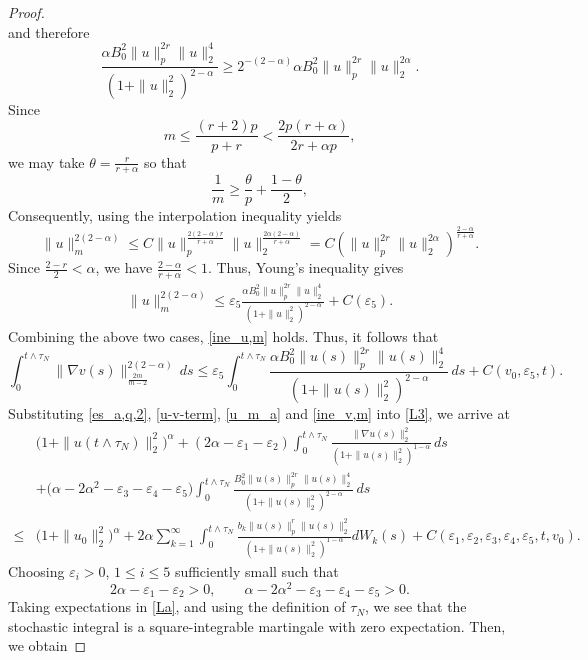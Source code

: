\documentclass[10pt,a4paper]{amsart}
\begin{document}
\begin{proof}
\[	\]
	and therefore
	\[
	\frac{\alpha{B_0^2}\|u\|_p^{2r}\|u\|_2^4}{(1+\|u\|_2^2)^{2-\alpha}}
	\ge
	2^{-(2-\alpha)}\alpha{B_0^2}\|u\|_p^{2r}\|u\|_2^{2\alpha}.
	\]
	Since
	\[
	m\le \frac{(r+2)p}{p+r}<\frac{2p(r+\alpha)}{2r+\alpha p},
	\]
	we may take $\theta=\frac{r}{r+\alpha}$ so that
	\[
	\frac1m\ge \frac{\theta}{p}+\frac{1-\theta}{2},
	\]
	Consequently, using the interpolation inequality yields
	\[
	\|u\|_m^{2(2-\alpha)}
	\le
	C\|u\|_p^{\frac{2(2-\alpha)r}{r+\alpha}}
	\|u\|_2^{\frac{2\alpha(2-\alpha)}{r+\alpha}}
	=
	C(\|u\|_p^{2r}\|u\|_2^{2\alpha})^{\frac{2-\alpha}{r+\alpha}}.
	\]
	Since $\frac{2-r}{2}<\alpha$, we have $\frac{2-\alpha}{r+\alpha}<1.$
	Thus, Young's inequality  gives
	\begin{align}
	    \|u\|_m^{2(2-\alpha)}
	\le
	\varepsilon_5\frac{\alpha{B_0^2}\|u\|_p^{2r}\|u\|_2^4}{(1+\|u\|_2^2)^{2-\alpha}}
	+
	C(\varepsilon_5).
	\end{align}
	Combining the above two cases, \eqref{ine_u,m} holds.
Thus, it follows  that
\begin{equation}
		\label{ine_v,m}
		\int_0^{t\wedge{\tau_N}}\|\nabla v(s)\|_{\frac{2m}{m-2}}^{2(2-\alpha)}\,ds
		\le
\varepsilon_5\int_0^{t\wedge{\tau_N}}\frac{\alpha{B_0^2}\|u(s)\|_p^{2r}\|u(s)\|_2^4}{(1+\|u(s)\|_2^2)^{2-\alpha}}\,ds+C(v_0,\varepsilon_5,t).
	\end{equation}
	Substituting  \eqref{es_a,q,2}, \eqref{u-v-term}, \eqref{u_m_a} and  \eqref{ine_v,m}
	into \eqref{L3}, we arrive at
	\begin{align}
		\label{La}
		\nonumber&\big(1+\|u(t\wedge{\tau_N})\|_2^2\big)^\alpha
		+(2\alpha-\varepsilon_1-\varepsilon_2)\int_0^{t\wedge{\tau_N}}
		\frac{\|\nabla u(s)\|_2^2}{(1+\|u(s)\|_2^2)^{1-\alpha}}\,ds\\\nonumber&+\bigl(\alpha-2\alpha^2-\varepsilon_3-\varepsilon_4-\varepsilon_5\bigr)
		\int_0^{t\wedge{\tau_N}}
		\frac{{B_0^2}\|u(s)\|_p^{2r}\|u(s)\|_2^4}
		{(1+\|u(s)\|_2^2)^{2-\alpha}}\,ds
		\nonumber\\
		\le&\big(1+\|u_0\|_2^2\big)^\alpha+2\alpha\sum_{k=1}^\infty\int_0^{t\wedge{\tau_N}}
		\frac{b_k\|u(s)\|_p^r\|u(s)\|_2^2}{(1+\|u(s)\|_2^2)^{1-\alpha}}dW_k(s)
		+C(\varepsilon_1, \varepsilon_2,\varepsilon_3,\varepsilon_4,\varepsilon_5,t,v_0).
	\end{align}
    Choosing $\varepsilon_i>0$, $1\le i\le 5$ sufficiently small such that
	\[
	2\alpha-\varepsilon_1-\varepsilon_2>0,
	\qquad
	\alpha-2\alpha^2-\varepsilon_3-\varepsilon_4-\varepsilon_5>0.
	\]
	Taking expectations in \eqref{La}, and using the definition of $\tau_N$, we see that the stochastic integral is a square-integrable  martingale with zero expectation. Then, we obtain

\end{proof}
\end{document}
